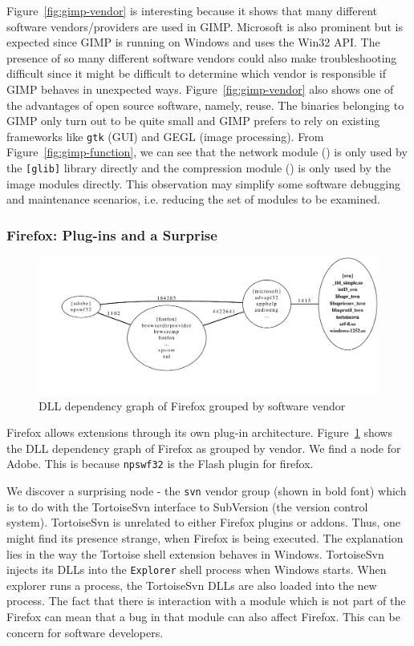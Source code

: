 Figure~\ref{fig:gimp-vendor} is interesting because it shows that
many different software vendors/providers are used in GIMP.
Microsoft is also prominent but is
expected since GIMP is running on Windows and uses the Win32 API.
The presence of so many different software vendors could also make
troubleshooting difficult since it might be difficult to determine
which vendor is responsible if GIMP behaves in unexpected ways.
Figure~\ref{fig:gimp-vendor} also shows
one of the advantages of open source software, namely, reuse. The
binaries belonging to GIMP only turn out to be quite small and
GIMP prefers to rely on
existing frameworks like {\tt gtk} (GUI) and GEGL (image processing).
 From Figure~\ref{fig:gimp-function}, we can see that the network module
() is only used by the {\tt [glib]} library directly
and the compression module () is only used by
the image modules directly.
This observation may simplify some software debugging and maintenance
scenarios, i.e. reducing the set of modules to be examined.

\subsubsection{Firefox: Plug-ins and a Surprise}

\begin{figure}
\centering
\includegraphics[width=1.0\columnwidth]{depvis/firefox-vendor.pdf}
\caption{DLL dependency graph of Firefox grouped by software vendor}
\label{fig:firefox}
\end{figure}

Firefox allows extensions through its own plug-in architecture.
Figure~\ref{fig:firefox} shows the DLL dependency graph
of Firefox as grouped by vendor. We find a node for Adobe.
This is because {\tt npswf32} is the Flash plugin for firefox.

We discover a surprising node -
the {\tt svn} vendor group (shown in bold font) which is to do with
the TortoiseSvn interface to SubVersion (the version control system).
TortoiseSvn is unrelated to either Firefox plugins or addons.
Thus, one might find its presence strange, when Firefox is being executed.
The explanation lies in the way the Tortoise shell extension
behaves in Windows. TortoiseSvn injects its DLLs into the
{\tt Explorer} shell process when Windows starts.
When explorer runs a process, the TortoiseSvn
DLLs are also loaded into the new process.
The fact that there is interaction with a module which is not part of
the Firefox can mean that a bug in that module can also affect Firefox.
This can be concern for software developers.

